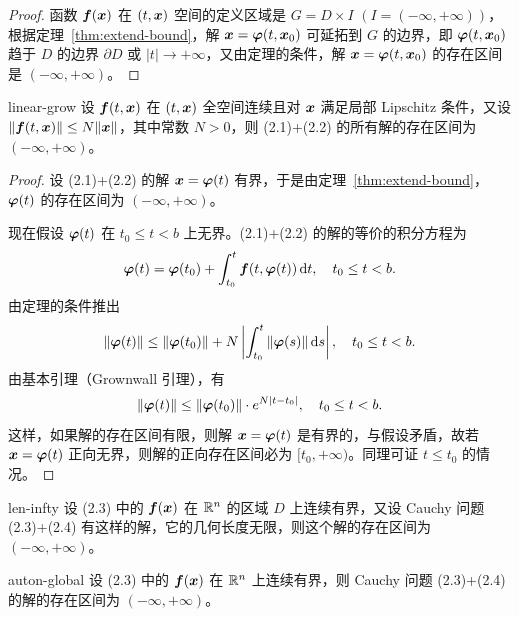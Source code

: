 \begin{proof}
函数 $\boldsymbol{f}(\boldsymbol{x})$ 在 $(t, \boldsymbol{x})$ 空间的定义区域是 $G = D \times I$ $(I = (-\infty, +\infty))$，根据定理~\ref{thm:extend-bound}，解 $\boldsymbol{x} = \boldsymbol{\varphi}(t, \boldsymbol{x}_0)$ 可延拓到 $G$ 的边界，即 $\boldsymbol{\varphi}(t, \boldsymbol{x}_0)$ 趋于 $D$ 的边界 $\partial D$ 或 $|t| \to +\infty$，又由定理的条件，解 $\boldsymbol{x} = \boldsymbol{\varphi}(t, \boldsymbol{x}_0)$ 的存在区间是 $(-\infty, +\infty)$。
\end{proof}

\begin{theorem}{}{linear-grow}
设 $\boldsymbol{f}(t, \boldsymbol{x})$ 在 $(t, \boldsymbol{x})$ 全空间连续且对 $\boldsymbol{x}$ 满足局部 Lipschitz 条件，又设 $\|\boldsymbol{f}(t, \boldsymbol{x})\| \leq N \|\boldsymbol{x}\|$，其中常数 $N > 0$，则 (2.1)+(2.2) 的所有解的存在区间为 $(-\infty, +\infty)$。
\end{theorem}

\begin{proof}
设 (2.1)+(2.2) 的解 $\boldsymbol{x} = \boldsymbol{\varphi}(t)$ 有界，于是由定理~\ref{thm:extend-bound}，$\boldsymbol{\varphi}(t)$ 的存在区间为 $(-\infty, +\infty)$。

现在假设 $\boldsymbol{\varphi}(t)$ 在 $t_0 \leq t < b$ 上无界。(2.1)+(2.2) 的解的等价的积分方程为
\[
\boldsymbol{\varphi}(t) = \boldsymbol{\varphi}(t_0) + \int_{t_0}^t \boldsymbol{f}(t, \boldsymbol{\varphi}(t))\,\mathrm{d} t, \quad t_0 \leq t < b.
\]
由定理的条件推出
\[
\|\boldsymbol{\varphi}(t)\| \leq \|\boldsymbol{\varphi}(t_0)\| + N\left|\int_{t_0}^t \|\boldsymbol{\varphi}(s)\|\,\mathrm{d} s\right|, \quad t_0 \leq t < b.
\]
由基本引理（Grownwall 引理），有
\[
\|\boldsymbol{\varphi}(t)\| \leq \|\boldsymbol{\varphi}(t_0)\| \cdot e^{N|t - t_0|}, \quad t_0 \leq t < b.
\]
这样，如果解的存在区间有限，则解 $\boldsymbol{x} = \boldsymbol{\varphi}(t)$ 是有界的，与假设矛盾，故若 $\boldsymbol{x} = \boldsymbol{\varphi}(t)$ 正向无界，则解的正向存在区间必为 $[t_0, +\infty)$。同理可证 $t \leq t_0$ 的情况。
\end{proof}

\begin{corollary}{}{len-infty}
设 (2.3) 中的 $\boldsymbol{f}(\boldsymbol{x})$ 在 $\mathbb{R}^n$ 的区域 $D$ 上连续有界，又设 Cauchy 问题 (2.3)+(2.4) 有这样的解，它的几何长度无限，则这个解的存在区间为 $(-\infty, +\infty)$。
\end{corollary}

\begin{corollary}{}{auton-global}
设 (2.3) 中的 $\boldsymbol{f}(\boldsymbol{x})$ 在 $\mathbb{R}^n$ 上连续有界，则 Cauchy 问题 (2.3)+(2.4) 的解的存在区间为 $(-\infty, +\infty)$。
\end{corollary}


